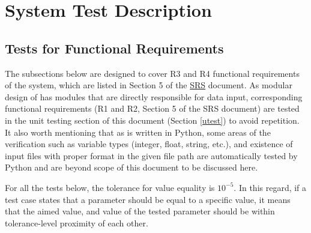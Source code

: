 \documentclass[12pt, titlepage]{article}
\begin{document}
\section{System Test Description}
\label{systest}

\subsection{Tests for Functional Requirements}
\label{func}
The subsections below are designed to cover R3 and R4 functional requirements of the system, which are listed in Section 5 of the \href{https://github.com/shmouses/SPDFM/tree/master/docs/SRS}{SRS} document. As modular design of \progname{} has modules that are directly responsible for data input, corresponding functional requirements (R1 and R2, Section 5 of the SRS document) are tested in the unit testing section of this document (Section \ref{utest}) to avoid repetition. It also worth mentioning that as \progname{} is written in Python, some areas of the verification such as variable types (integer, float, string, etc.), and existence of input files with proper format in the given file path are automatically tested by Python and are beyond scope of this document to be discussed here. 

For all the tests below, the tolerance for value equality is $10^{-5}$. In this regard, if a test case states that a parameter should be equal to a specific value, it means that the aimed value, and value of the tested parameter should be within tolerance-level proximity of each other.   
  




		

\end{document}
